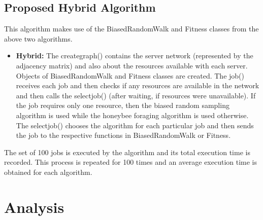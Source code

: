 \subsection{Proposed Hybrid Algorithm}
This algorithm makes use of the BiasedRandomWalk and Fitness classes from the above two algorithms. 
\begin{itemize}
\item \textbf{Hybrid:} The creategraph() contains the server network (represented by the adjacency matrix)  and also about the resources available with each server. Objects of BiasedRandomWalk and Fitness classes are created. The job() receives each job and then checks if any resources are available in the network and then calls the selectjob() (after waiting, if resources were unavailable). If the job requires only one resource, then the biased random sampling algorithm is used while the honeybee foraging algorithm is used otherwise. The selectjob() chooses the algorithm for each particular job and then sends the job to the respective functions in BiasedRandomWalk or Fitness. 
\end{itemize}
The set of 100 jobs is executed by the algorithm and its total execution time is recorded. This process is repeated for 100 times and an average execution time is obtained for each algorithm.

\section{Analysis}
